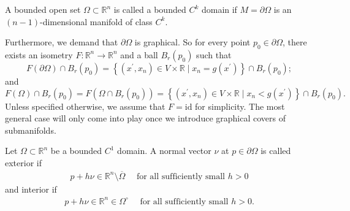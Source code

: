 \begin{definition}\label{def:bdd-ck-dom}
	A bounded open set $\Omega \subset \mathbb{R}^{n}$ is called a bounded $C^{k}$ domain if $M = \partial \Omega$ is an $(n-1)$-dimensional manifold of class $C^{k}$.

	Furthermore, we demand that $\partial \Omega$ is graphical. So for every point $p_{0} \in \partial \Omega$, there exists an isometry $F: \mathbb{R}^{n} \to \mathbb{R}^{n}$ and a ball $B_{r}(p_{0})$ such that
	$$
		F(\partial \Omega) \cap B_r(p_{0})=\left\{\left(x^{\prime}, x_n\right) \in V \times \mathbb{R} \mid x_n=g\left(x^{\prime}\right)\right\} \cap B_r(p_{0}) ;
	$$
	and
	$$
		F(\Omega) \cap B_r(p_{0})=F\left(\Omega \cap B_r(p_{0})\right)=\left\{\left(x^{\prime}, x_n\right) \in V \times \mathbb{R} \mid x_n<g\left(x^{\prime}\right)\right\} \cap B_r(p_{0}).
	$$
	Unless specified otherwise, we assume that $F = \text{id}$ for simplicity. The most general case will only come into play once we introduce graphical covers of submanifolds.
\end{definition}

\begin{definition}\label{def:ext-norm-map}
	Let $\Omega \subset \mathbb{R}^{n}$ be a bounded $C^{1}$ domain. A normal vector $\nu$ at $p \in \partial\Omega$ is called exterior if
	\begin{align*}
		p+h \nu \in \mathbb{R}^{n} \setminus \overline{ \Omega } \quad \text{ for all sufficiently small } h > 0
	\end{align*}
	and interior if
	\begin{align*}
		p+h \nu \in \mathbb{R}^{n} \in \Omega^{\circ} \quad \text{ for all sufficiently small } h > 0.
	\end{align*}
\end{definition}


